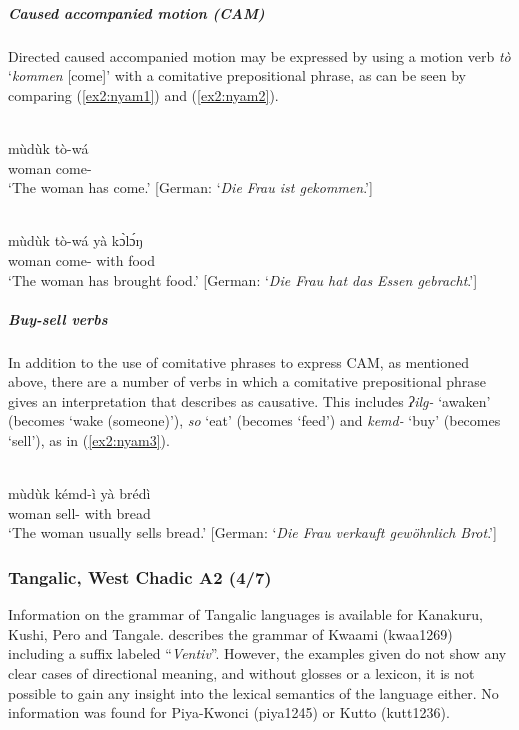 \subparagraph{Caused accompanied motion (CAM)}



Directed caused accompanied motion may be expressed by using a motion verb \textit{tò} `\textit{kommen} [come]' with a comitative prepositional phrase, as can be seen by comparing (\ref{ex2:nyam1}) and (\ref{ex2:nyam2}).

\ea\label{ex2:nyam1}
 \\
\gll mùdùk tò-wá \\
woman come- \\
\glt `The woman has come.' [German: `\textit{Die Frau ist gekommen}.']

\ex\label{ex2:nyam2}
 \\
\gll mùdùk tò-wá yà kɔ̀lɔ́ŋ \\
woman come- with food \\
\glt `The woman has brought food.' [German: `\textit{Die Frau hat das Essen gebracht}.']
\z 

\subparagraph{Buy-sell verbs}



In addition to the use of comitative phrases to express CAM, as mentioned above, there are a number of verbs in which a comitative prepositional phrase gives an interpretation that \citet[127]{andreasGrammatischeBeschreibungNyam2012} describes as causative. This includes \textit{ʔilg-} `awaken' (becomes `wake (someone)'), \textit{so} `eat' (becomes `feed') and \textit{kemd-} `buy' (becomes `sell'), as in (\ref{ex2:nyam3}). 

\ea\label{ex2:nyam3}
 \\
\gll mùdùk kémd-ì yà brédì \\
woman sell- with bread \\
\glt `The woman usually sells bread.' [German: `\textit{Die Frau verkauft gewöhnlich Brot}.']
\z 

\subsubsection{Tangalic, West Chadic A2 (4/7)}

Information on the grammar of Tangalic languages is available for Kanakuru, Kushi, Pero and Tangale. \citet{legerGrammatikKwamiSpracheNordostnigeria1994} describes the grammar of Kwaami (kwaa1269) including a suffix labeled ``\textit{Ventiv}''. However, the examples given do not show any clear cases of directional meaning, and without glosses or a lexicon, it is not possible to gain any insight into the lexical semantics of the language either. No information was found for Piya-Kwonci (piya1245) or Kutto (kutt1236).

